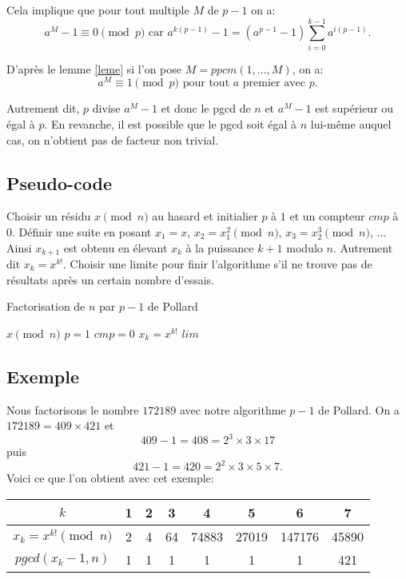 \documentclass[french, 12pt, titlepage]{article}
\begin{document}
Cela implique que pour tout multiple $M$ de $p-1$ on a: \[ a^M - 1 \equiv 0 \pmod p \text{ car } a^{k(p-1)} - 1 = (a^{p-1} - 1 )\sum\limits_{i=0}^{k-1} a^{i(p-1)} . \]

D'après le lemme \ref{leme} si l'on pose $M = ppcm(1, ..., M)$, on a: \[ a^M \equiv 1 \pmod p \text{ pour tout } a \text{ premier avec } p . \]

Autrement dit, $p$ divise $a^M - 1$ et donc le pgcd de $n$ et $a^M - 1$ est supérieur ou égal à $p.$
En revanche, il est possible que le pgcd soit égal à $n$ lui-même auquel cas, on n'obtient pas de facteur non trivial.

\subsection{Pseudo-code}

Choisir un résidu $x \pmod n$ au hasard et initialier $p$ à $1$ et un compteur $cmp$ à $0.$
Définir une suite en posant $x_1 = x$, $x_2 = x_1^2 \pmod n$, $x_3 = x_2^3 \pmod n$, ... Ainsi $x_ {k+1}$ est obtenu en élevant $x_k$ à la puissance $k+1$ modulo $n.$ Autrement dit $x_k = x^{k!}.$
Choisir une limite pour finir l'algorithme s'il ne trouve pas de résultats après un certain nombre d'essais.

\begin{algorithm}
\caption{Factorisation de $n$ par $p-1$ de Pollard}
\BlankLine
$x \pmod n$\;
$p = 1$\;
$cmp = 0$\;
$x_k = x^{k!}$\;
$lim$\;
\end{algorithm}

\subsection{Exemple}

Nous factorisons le nombre $172189$ avec notre algorithme $p-1$ de Pollard.
On a $172189 = 409 \times 421$ et \[409 - 1 = 408 = 2^3 \times 3 \times 17 \] puis \[421-1 = 420 = 2^2 \times 3 \times 5 \times 7.\] 
Voici ce que l'on obtient avec cet exemple:

\begin{center}
\begin{tabular}{|c||c|c|c|c|c|c|c|}
\hline
$k$ & 1 & 2 & 3 & 4 & 5 & 6 & 7 \\
\hline
$x_k = x^{k!} \pmod n$ & 2 & 4 & 64 & 74883 & 27019 & 147176 & 45890 \\
\hline
$pgcd(x_k -1, n)$ & 1 & 1 & 1 & 1 & 1 & 1 & 421\\
\hline
\end{tabular}
\end{center}
\end{document}
